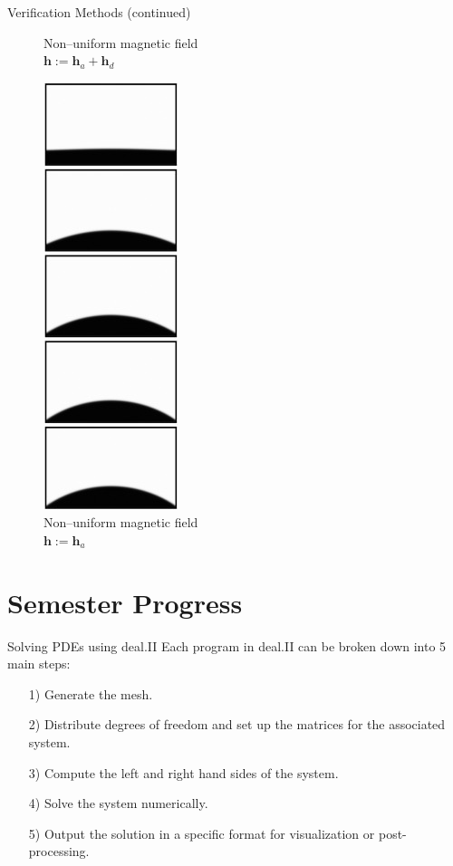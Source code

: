 \documentclass[9pt]{beamer}
\begin{document}
\begin{frame}{Verification Methods (continued)}
\begin{minipage}{.3\paperwidth}
\begin{figure}[!b]
			\caption*{Non--uniform magnetic field\\ \centering$\mathbf{h} := \mathbf{h}_a + \mathbf{h}_d$}
		\end{figure}
	\end{minipage}%
	\begin{minipage}{.3\paperwidth}
		\begin{figure}[!b]
			\centering
			\includegraphics[scale=.56]{Oval.jpg}
			\caption*{Non--uniform magnetic field\\ \centering$\mathbf{h} := \mathbf{h}_a$}
		\end{figure}
	\end{minipage}%
\end{frame}

\section{Semester Progress}
\begin{frame}{Solving PDEs using deal.II}
Each program in deal.II can be broken down into 5 main steps:
\begin{itemize}
	\item[1)] Generate the mesh.
	
	\item[2)] Distribute degrees of freedom and set up the matrices for the associated system.
	
	\item[3)] Compute the left and right hand sides of the system. 
	
	\item[4)] Solve the system numerically.
	
	\item[5)] Output the solution in a specific format for visualization or post-processing.
\end{itemize}
\end{frame}
\end{document}
